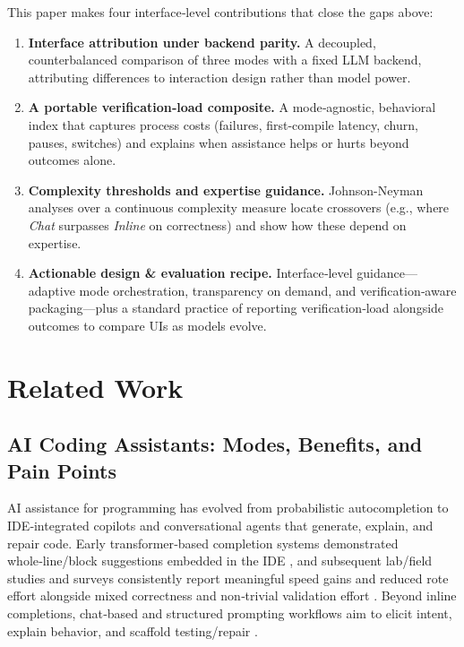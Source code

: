 \documentclass[sigconf]{acmart}
\begin{document}
This paper makes four interface‑level contributions that close the gaps above:
\begin{enumerate}[leftmargin=1.5em,itemsep=0.2em,topsep=0.2em]
  \item \textbf{Interface attribution under backend parity.} A decoupled, counterbalanced comparison of three modes with a fixed LLM backend, attributing differences to interaction design rather than model power.
  \item \textbf{A portable verification‑load composite.} A mode‑agnostic, behavioral index that captures process costs (failures, first-compile latency, churn, pauses, switches) and explains when assistance helps or hurts beyond outcomes alone.
  \item \textbf{Complexity thresholds and expertise guidance.} Johnson-Neyman analyses over a continuous complexity measure locate crossovers (e.g., where \emph{Chat} surpasses \emph{Inline} on correctness) and show how these depend on expertise.
  \item \textbf{Actionable design \& evaluation recipe.} Interface‑level guidance—adaptive mode orchestration, transparency on demand, and verification‑aware packaging—plus a standard practice of reporting verification‑load alongside outcomes to compare UIs as models evolve.
\end{enumerate}



 \section{Related Work}

\subsection{AI Coding Assistants: Modes, Benefits, and Pain Points}
AI assistance for programming has evolved from probabilistic autocompletion to IDE‑integrated copilots and conversational agents that generate, explain, and repair code. Early transformer‑based completion systems demonstrated whole‑line/block suggestions embedded in the IDE \cite{svyatkovskiy2020intellicode}, and subsequent lab/field studies and surveys consistently report meaningful speed gains and reduced rote effort alongside mixed correctness and non‑trivial validation effort \cite{vaithilingam2022expectation,peng2023impact,liang2024large,sergeyuk2025using}. Beyond inline completions, chat‑based and structured prompting workflows aim to elicit intent, explain behavior, and scaffold testing/repair \cite{nam2024using,tang2023empirical,asare2024user,liu2023wants,brender2025structured,sasaki2025landscape}. 
\end{document}

